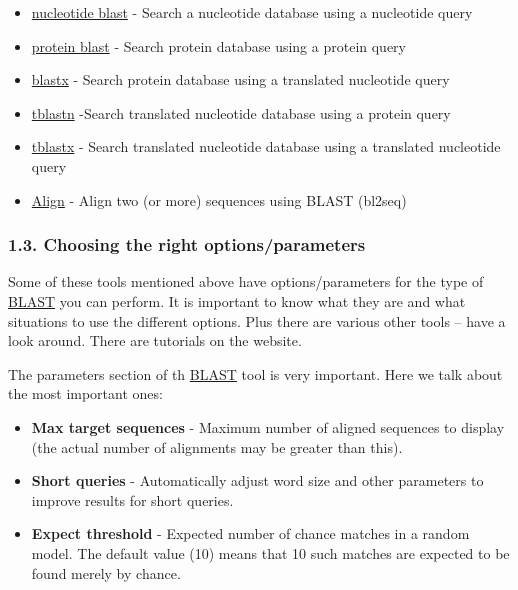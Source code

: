 \documentclass[]{article}
\begin{document}
\begin{itemize}
\itemsep1pt\parskip0pt
\item
  \href{http://blast.ncbi.nlm.nih.gov/Blast.cgi?PROGRAM=blastn\&PAGE_TYPE=BlastSearch\&LINK_LOC=blasthome}{nucleotide
  blast} - Search a nucleotide database using a nucleotide query
\item
  \href{http://blast.ncbi.nlm.nih.gov/Blast.cgi?PROGRAM=blastp\&PAGE_TYPE=BlastSearch\&LINK_LOC=blasthome}{protein
  blast} - Search protein database using a protein query
\item
  \href{http://blast.ncbi.nlm.nih.gov/Blast.cgi?PROGRAM=blastx\&PAGE_TYPE=BlastSearch\&LINK_LOC=blasthome}{blastx}
  - Search protein database using a translated nucleotide query
\item
  \href{http://blast.ncbi.nlm.nih.gov/Blast.cgi?PROGRAM=tblastn\&PAGE_TYPE=BlastSearch\&LINK_LOC=blasthome}{tblastn}
  -Search translated nucleotide database using a protein query
\item
  \href{http://blast.ncbi.nlm.nih.gov/Blast.cgi?PROGRAM=tblastx\&PAGE_TYPE=BlastSearch\&LINK_LOC=blasthome}{tblastx}
  - Search translated nucleotide database using a translated nucleotide
  query
\item
  \href{http://blast.ncbi.nlm.nih.gov/Blast.cgi?PAGE_TYPE=BlastSearch\&BLAST_SPEC=blast2seq\&LINK_LOC=align2seq}{Align}
  - Align two (or more) sequences using BLAST (bl2seq)
\end{itemize}

\subsubsection{1.3. Choosing the right
options/parameters}\label{choosing-the-right-optionsparameters}

Some of these tools mentioned above have options/parameters for the type
of \href{http://blast.ncbi.nlm.nih.gov/}{BLAST} you can perform. It is
important to know what they are and what situations to use the different
options. Plus there are various other tools -- have a look around. There
are tutorials on the website.

The parameters section of th
\href{http://blast.ncbi.nlm.nih.gov/}{BLAST} tool is very important.
Here we talk about the most important ones:

\begin{itemize}
\itemsep1pt\parskip0pt
\item
  \textbf{Max target sequences} - Maximum number of aligned sequences to
  display (the actual number of alignments may be greater than this).
\item
  \textbf{Short queries} - Automatically adjust word size and other
  parameters to improve results for short queries.
\item
  \textbf{Expect threshold} - Expected number of chance matches in a
  random model. The default value (10) means that 10 such matches are
  expected to be found merely by chance.
\end{itemize}
\end{document}
